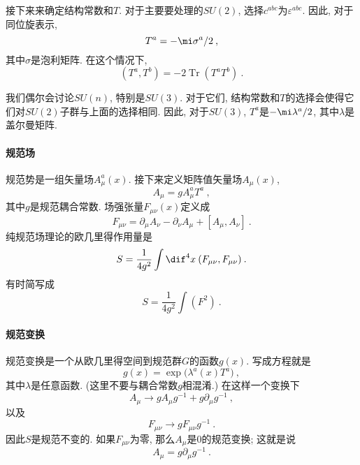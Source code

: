 接下来来确定结构常数和$T$. 对于主要要处理的$SU(2)$, 选择$c^{abc}$为$\varepsilon^{abc}$. 因此, 对于同位旋表示,
\begin{equation}
    T^{a} = -\mi\sigma^{a}/2 \:, \label{instanton3.3}
\end{equation}
其中$\sigma$是泡利矩阵. 在这个情况下,
\begin{equation}
    (T^{a},T^{b})=-2\operatorname{Tr}(T^{a}T^{b}) \:. \label{instanton3.4}
\end{equation}

我们偶尔会讨论$SU(n)$, 特别是$SU(3)$. 对于它们, 结构常数和$T$的选择会使得它们对$SU(2)$子群与上面的选择相同. 因此, 对于$SU(3)$, $T^{a}$是$-\mi\lambda^{a}/2$, 其中$\lambda$是盖尔曼矩阵.

\paragraph*{规范场} 规范势是一组矢量场$A_{\mu}^{a}(x)$. 接下来定义矩阵值矢量场$A_{\mu}(x)$,
\begin{equation}
    A_{\mu}=gA_{\mu}^{a}T^{a} \:, \label{instanton3.5}
\end{equation}   
其中$g$是规范耦合常数. 场强张量$F_{\mu\nu}(x)$定义成
\begin{equation}
    F_{\mu\nu} = \partial_{\mu}A_{\nu}- \partial_{\nu}A_{\mu} + [A_{\mu},A_{\nu}] \:. \label{instanton3.6}
\end{equation}
纯规范场理论的欧几里得作用量是
\begin{equation}
    S= \frac{1}{4g^{2}} \int \dif^{4}x\: (F_{\mu\nu},F_{\mu\nu}) \:. \label{instanton3.7}
\end{equation}
有时简写成
\begin{equation}
    S=\frac{1}{4g^{2}} \int (F^{2}) \:. \label{instanton3.8}
\end{equation}

\paragraph*{规范变换} 规范变换是一个从欧几里得空间到规范群$G$的函数$g(x)$. 写成方程就是
\begin{equation}
    g(x) = \exp \bigl( \lambda^{a}(x)T^{a}\bigr) \:, \label{instanton3.9}
\end{equation}
其中$\lambda$是任意函数. (这里不要与耦合常数$g$相混淆.) 在这样一个变换下
\begin{equation}
    A_{\mu} \to g A_{\mu} g^{-1} +g \partial_{\mu} g^{-1} \:, \label{instanton3.10}
\end{equation}
以及
\begin{equation}
    F_{\mu\nu} \to g F_{\mu\nu} g^{-1} \:. \label{instanton3.11}
\end{equation}
因此$S$是规范不变的. 如果$F_{\mu\nu}$为零, 那么$A_{\mu}$是0的规范变换; 这就是说
\begin{equation}
    A_{\mu} = g\partial_{\mu}g^{-1} \:. \label{instanton3.12}
\end{equation}

